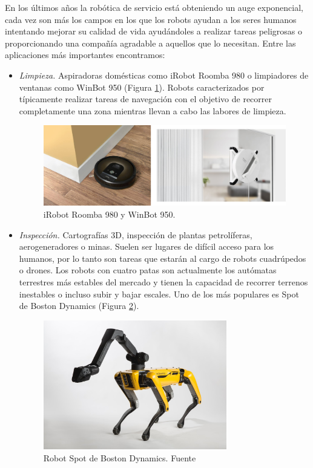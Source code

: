 En los últimos años la robótica de servicio está obteniendo un auge exponencial, cada vez son más los campos en los que los robots ayudan a los seres humanos intentando mejorar su calidad de vida ayudándoles a realizar tareas peligrosas o proporcionando una compañía agradable a aquellos que lo necesitan. Entre las aplicaciones más importantes encontramos:

\begin{itemize}
 \item \textit{Limpieza.} Aspiradoras domésticas como iRobot Roomba 980 o limpiadores de ventanas como WinBot 950 (Figura \ref{fig:robots_limpieza}). Robots caracterizados por típicamente realizar tareas de navegación con el objetivo de recorrer completamente una zona mientras llevan a cabo las labores de limpieza.\\
 
\begin{figure} [h!]
  \begin{center}
    \includegraphics[width=12cm]{figs/robots_limpieza.png}
  \end{center}
  \caption{iRobot Roomba 980 y WinBot 950.}
  \label{fig:robots_limpieza}
\end{figure}

\item \textit{Inspección.} Cartografías 3D, inspección de plantas petrolíferas, aerogeneradores o minas. Suelen ser lugares de difícil acceso para los humanos, por lo tanto son tareas que estarán al cargo de robots cuadrúpedos o drones. Los robots con cuatro patas son actualmente los autómatas terrestres más estables del mercado y tienen la capacidad de recorrer terrenos inestables o incluso subir y bajar escales.  Uno de los más populares es Spot de Boston Dynamics (Figura \ref{fig:spot}).\\

\begin{figure} [h!]
  \begin{center}
    \includegraphics[width=8cm]{figs/spot.jpg}
  \end{center}
  \caption{Robot Spot de Boston Dynamics. Fuente \cite{xataka}}
  \label{fig:spot}
\end{figure}


\end{itemize}
